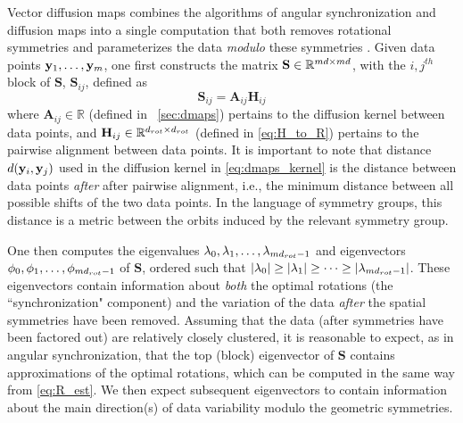 Vector diffusion maps combines the algorithms of angular synchronization and diffusion maps into a single computation that both removes rotational symmetries and parameterizes the data {\em modulo} these symmetries \cite{singer2012vector}.
%
Given data points $\mathbf{y}_1, \dots, \mathbf{y}_m$, one first constructs the matrix $\mathbf{S} \in \mathbb{R}^{m d \times m d}$, with the $i,j^{th}$ block of $\mathbf{S}$, $\mathbf{S}_{ij}$, defined as
\begin{equation} \label{eq:vdm_S}
	\mathbf{S}_{ij} = \mathbf{A}_{ij} \mathbf{H}_{ij}
\end{equation}
%
where $\mathbf{A}_{ij} \in \mathbb{R}$ (defined in \sec~\ref{sec:dmaps}) pertains to the diffusion kernel between data points, and $\mathbf{H}_{ij} \in \mathbb{R}^{d_{rot} \times d_{rot}}$ (defined in \eqref{eq:H_to_R}) pertains to the pairwise alignment between data points.
%
It is important to note that distance $d(\mathbf{y}_i, \mathbf{y}_j)$ used in the diffusion kernel in \eqref{eq:dmaps_kernel} is the distance between data points {\it after} after pairwise alignment, i.e., the minimum distance between all possible shifts of the two data points.
%
In the language of symmetry groups, this distance is a metric between the orbits induced by the relevant symmetry group.

One then computes the eigenvalues $\lambda_0, \lambda_1, \dots, \lambda_{m d_{rot}-1}$ and eigenvectors $\phi_0, \phi_1, \dots, \phi_{m d_{rot}-1}$ of $\mathbf{S}$, ordered such that $|\lambda_0| \ge |\lambda_1| \ge \dots \ge |\lambda_{m d_{rot}-1}|$.
%
These eigenvectors contain information about {\it both} the optimal rotations (the ``synchronization" component) and the
variation of the data {\it after} the spatial symmetries have been removed.
%
Assuming that the data (after symmetries have been factored out) are relatively closely clustered, it is reasonable
to expect, as in angular synchronization, that the top (block) eigenvector of $\mathbf{S}$ contains approximations of the optimal rotations,
which can be computed in the same way from \eqref{eq:R_est}.
%
We then expect subsequent eigenvectors to contain information about the main direction(s) of data variability modulo the geometric symmetries.

